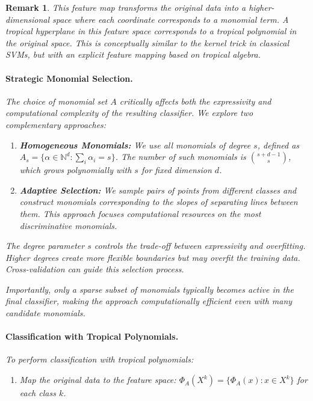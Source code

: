 \documentclass{article}
\newtheorem{remark}{Remark}
\begin{document}
\begin{remark}
This feature map transforms the original data into a higher-dimensional space where each coordinate corresponds to a monomial term. A tropical hyperplane in this feature space corresponds to a tropical polynomial in the original space. This is conceptually similar to the kernel trick in classical SVMs, but with an explicit feature mapping based on tropical algebra.

\paragraph{Strategic Monomial Selection.}
The choice of monomial set $A$ critically affects both the expressivity and computational complexity of the resulting classifier. We explore two complementary approaches:

\begin{enumerate}
    \item \textbf{Homogeneous Monomials:} We use all monomials of degree $s$, defined as 
    $A_s = \{\alpha \in \mathbb{N}^d : \sum_i \alpha_i = s\}$. The number of such monomials is $\binom{s+d-1}{s}$, which grows polynomially with $s$ for fixed dimension $d$.
    
    \item \textbf{Adaptive Selection:} We sample pairs of points from different classes and construct monomials corresponding to the slopes of separating lines between them. This approach focuses computational resources on the most discriminative monomials.
\end{enumerate}

The degree parameter $s$ controls the trade-off between expressivity and overfitting. Higher degrees create more flexible boundaries but may overfit the training data. Cross-validation can guide this selection process.

Importantly, only a sparse subset of monomials typically becomes active in the final classifier, making the approach computationally efficient even with many candidate monomials.

\paragraph{Classification with Tropical Polynomials.}\label{subsec:poly_classification}
To perform classification with tropical polynomials:

\begin{enumerate}
    \item Map the original data to the feature space: $\Phi_A(X^k) = \{\Phi_A(x) : x \in X^k\}$ for each class $k$.
    

\end{enumerate}
\end{remark}
\end{document}
